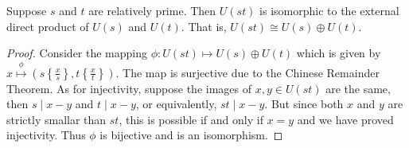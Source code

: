 \begin{proposition}
	Suppose $s$ and $t$ are relatively prime. Then $U(st)$ is isomorphic to the external direct product of $U(s)$ and $U(t)$. That is, $U(st)\cong U(s)\oplus U(t)$.
\end{proposition}
\begin{proof}
	Consider the mapping $\phi:U(st)\mapsto U(s)\oplus U(t)$ which is given by $x\stackrel{\phi}{\mapsto}\left(s\left\{\frac{x}{s}\right\},t\left\{\frac{x}{t}\right\}\right)$. The map is surjective due to the Chinese Remainder Theorem. As for injectivity, suppose the images of $x,y\in U(st)$ are the same, then $s\mid x-y$ and $t\mid x-y$, or equivalently, $st\mid x-y$. But since both $x$ and $y$ are strictly smallar than $st$, this is possible if and only if $x=y$ and we have proved injectivity. Thus $\phi$ is bijective and is an isomorphism.
\end{proof}